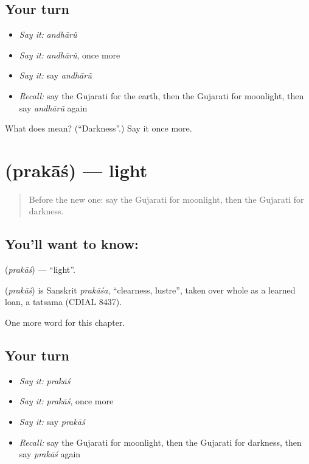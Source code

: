 \subsection*{Your turn}
\begin{itemize}
\raggedright
  \item \emph{Say it:} \emph{andhārũ}
  \item \emph{Say it:} \emph{andhārũ}, once more
  \item \emph{Say it:} say \emph{andhārũ}
  \item \emph{Recall:} say the Gujarati for the earth, then the Gujarati for moonlight, then say \emph{andhārũ} again
\end{itemize}

\begin{tcolorbox}[breakable,colback=teal!4,colframe=teal!35!black,title={Before you move on}]
What does  mean? (\textquotedblleft{}Darkness\textquotedblright{}.) Say it once more.
\end{tcolorbox}
\section[\texorpdfstring{\gu{પ્રકાશ} (prakāś)}{પ્રકાશ (prakāś)}]{ (prakāś) — light}

\label{lesson:GU-C121-prakas}



\begin{quote}
Before the new one: say the Gujarati for moonlight, then the Gujarati for darkness.
\end{quote}

\subsection*{You'll want to know: }
\textbf{} (\emph{prakāś}) — \textquotedblleft{}light\textquotedblright{}.

\begin{cousinweb}
\textbf{} (\emph{prakāś}) is Sanskrit \emph{prakāśa}, \textquotedblleft{}clearness, lustre\textquotedblright{}, taken over whole as a learned loan, a tatsama (CDIAL 8437).
\end{cousinweb}

\begin{grammarlens}[title={What you've built}]
One more word for this chapter.
\end{grammarlens}

\subsection*{Your turn}
\begin{itemize}
\raggedright
  \item \emph{Say it:} \emph{prakāś}
  \item \emph{Say it:} \emph{prakāś}, once more
  \item \emph{Say it:} say \emph{prakāś}
  \item \emph{Recall:} say the Gujarati for moonlight, then the Gujarati for darkness, then say \emph{prakāś} again
\end{itemize}

